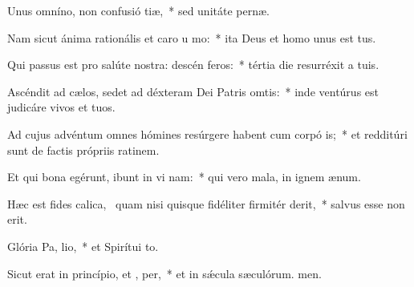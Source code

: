 \item Unus omníno, non confusió tiæ,~* sed unitáte pernæ.
\item Nam sicut ánima rationális et caro u  mo:~* ita Deus et homo unus est tus.
\item Qui passus est pro salúte nostra: descén  feros:~* tértia die resurréxit a tuis.
\item Ascéndit ad cælos, sedet ad déxteram Dei Patris omtis:~* inde ventúrus est judicáre vivos et tuos.
\item Ad cujus advéntum omnes hómines resúrgere habent cum corpó is;~* et redditúri sunt de factis própriis ratinem.
\item Et qui bona egérunt, ibunt in vi nam:~* qui vero mala, in ignem ænum.
\item Hæc est fides calica,~\pscross{} quam nisi quisque fidéliter firmitér derit,~* salvus esse non erit.
\item Glória Pa,  lio,~* et Spirítui to.
\item Sicut erat in princípio, et ,  per,~* et in sǽcula sæculórum. men.
